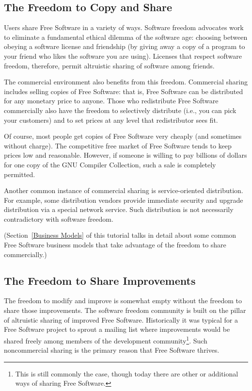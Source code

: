 \subsection{The Freedom to Copy and Share}

Users share Free Software in a variety of ways. Software freedom advocates
work to eliminate a fundamental ethical dilemma of the software age: choosing
between obeying a software license and friendship (by giving away a copy of a
program to your friend who likes the software you are using). Licenses that
respect software freedom, therefore, permit altruistic sharing of software
among friends.

The commercial environment also benefits from this freedom.  Commercial sharing
includes selling copies of Free Software: that is, Free Software can
be distributed for any monetary
price to anyone.  Those who redistribute Free Software commercially also have
the freedom to selectively distribute (i.e., you can pick your customers) and
to set prices at any level that redistributor sees fit.

Of course, most people get copies of Free Software very cheaply (and
sometimes without charge).  The competitive free market of Free Software
tends to keep prices low and reasonable.  However, if someone is willing to
pay billions of dollars for one copy of the GNU Compiler Collection, such a
sale is completely permitted.

Another common instance of commercial sharing is service-oriented
distribution.  For example, some distribution vendors provide immediate
security and upgrade distribution via a special network service.  Such
distribution is not necessarily contradictory with software freedom.

(Section~\ref{Business Models} of this tutorial talks in detail about some
common Free Software business models that take advantage of the freedom to
share commercially.)

\subsection{The Freedom to Share Improvements}

The freedom to modify and improve is somewhat empty without the freedom to
share those improvements.  The software freedom community is built on the
pillar of altruistic sharing of improved Free Software. Historically
it was typical for a
Free Software project to sprout a mailing list where improvements
would be shared
freely among members of the development community\footnote{This is still
commonly the case, though today there are other or additional ways of
sharing Free Software.}.   Such noncommercial
sharing is the primary reason that Free Software thrives.

